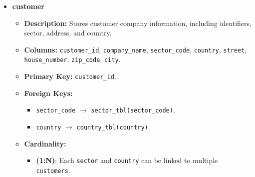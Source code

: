 \documentclass[12pt,a4paper]{article}
\begin{document}
\begin{itemize}
\item \textbf{customer}
    \begin{itemize}
        \item \textbf{Description:} Stores customer company information, including identifiers, sector, address, and country.
        \item \textbf{Columns:} \texttt{customer\_id}, \texttt{company\_name}, \texttt{sector\_code}, \texttt{country}, \texttt{street}, \texttt{house\_number}, \texttt{zip\_code}, \texttt{city}.
        \item \textbf{Primary Key:} \texttt{customer\_id}.
        \item \textbf{Foreign Keys:}
        \begin{itemize}
            \item \texttt{sector\_code} $\to$ \texttt{sector\_tbl(sector\_code)}.
            \item \texttt{country} $\to$ \texttt{country\_tbl(country)}.
        \end{itemize}
        \item \textbf{Cardinality:}
        \begin{itemize}
            \item \textbf{(1:N)}: Each \texttt{sector} and \texttt{country} can be linked to multiple \texttt{customers}.
        \end{itemize}
    \end{itemize}


\end{itemize}
\end{document}
